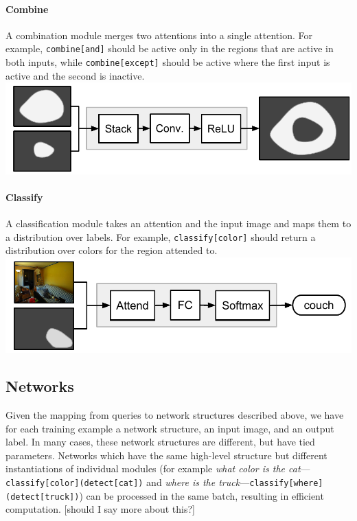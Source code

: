 \documentclass[10pt,twocolumn,letterpaper]{article}
\begin{document}
\paragraph{Combine}

A combination module  merges two attentions into a single attention. For example, {\small\tt combine[and]} should be active only in the regions that are active in both inputs, while {\small\tt{combine[except]}} should be active where the first input is active and the second is inactive.\\[1em]
\includegraphics[width=\columnwidth]{fig/combine}

\paragraph{Classify}

A classification module  takes an attention and the input image and maps them to a distribution over labels. For example, {\small\tt classify[color]} should return a distribution over colors for the region attended to.\\[1em]
\includegraphics[width=\columnwidth]{fig/classify}

\subsection{Networks}

Given the mapping from queries to network structures described above, we have for each training example a network structure, an input image, and an output label. In many cases, these network structures are different, but have tied parameters. Networks which have the same high-level structure but different instantiations of individual modules (for example \emph{what color is the cat}---{\small\tt classify[color](detect[cat])} and \emph{where is the truck}---{\small\tt classify[where](detect[truck])}) can be processed in the same batch, resulting in efficient computation. [should I say more about this?]
\end{document}
